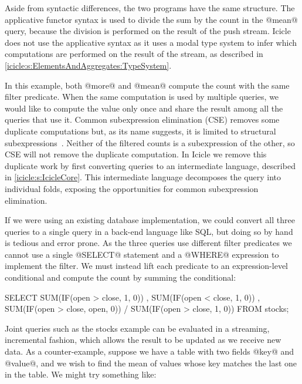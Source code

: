 Aside from syntactic differences, the two programs have the same structure.
The applicative functor syntax is used to divide the sum by the count in the @mean@ query, because the division is performed on the result of the push stream.
Icicle does not use the applicative syntax as it uses a modal type system to infer which computations are performed on the result of the stream, as described in \autoref{icicle:s:ElementsAndAggregates:TypeSystem}.

In this example, both @more@ and @mean@ compute the count with the same filter predicate.
When the same computation is used by multiple queries, we would like to compute the value only once and share the result among all the queries that use it.
Common subexpression elimination (CSE) removes some duplicate computations but, as its name suggests, it is limited to structural subexpressions~\cite{chitil1997uncommon}.
Neither of the filtered counts is a subexpression of the other, so CSE will not remove the duplicate computation.
In Icicle we remove this duplicate work by first converting queries to an intermediate language, described in \autoref{icicle:s:IcicleCore}.
This intermediate language decomposes the query into individual folds, exposing the opportunities for common subexpression elimination.

If we were using an existing database implementation, we could convert all three queries to a single query in a back-end language like SQL, but doing so by hand is tedious and error prone.
As the three queries use different filter predicates we cannot use a single @SELECT@ statement and a @WHERE@ expression to implement the filter.
We must instead lift each predicate to an expression-level conditional and compute the count by summing the conditional:

\begin{sql}
  SELECT SUM(IF(open > close, 1,    0))
       , SUM(IF(open < close, 1,    0))
       , SUM(IF(open > close, open, 0))
       / SUM(IF(open > close, 1,    0))
  FROM stocks;
\end{sql}


Joint queries such as the stocks example can be evaluated in a streaming, incremental fashion, which allows the result to be updated as we receive new data.
As a counter-example, suppose we have a table with two fields @key@ and @value@, and we wish to find the mean of values whose key matches the last one in the table.
We might try something like:

